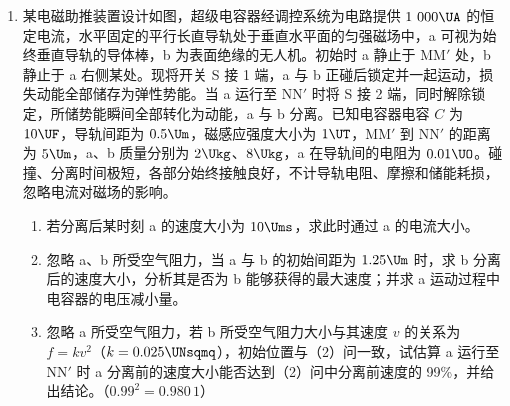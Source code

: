 \documentclass[\gkver]{gaokaozhenti}
\begin{document}
\begin{enumerate}
\onepicture[w=9.0cm, align=right]{}


\item
某电磁助推装置设计如图，超级电容器经调控系统为电路提供 $1\ 000\UA$ 的恒定电流，水平固定的平行长直导轨处于垂直水平面的匀强磁场中，a 可视为始终垂直导轨的导体棒，b 为表面绝缘的无人机。初始时 a 静止于 MM$'$ 处，b 静止于 a 右侧某处。现将开关 S 接 1 端，a 与 b 正碰后锁定并一起运动，损失动能全部储存为弹性势能。当 a 运行至 NN$'$ 时将 S 接 2 端，同时解除锁定，所储势能瞬间全部转化为动能，a 与 b 分离。已知电容器电容 $C$ 为 $10\UF$，导轨间距为 $0.5\Um$，磁感应强度大小为 $1\UT$，MM$'$ 到 NN$'$ 的距离为 $5\Um$，a、b 质量分别为 $2\Ukg$、$8\Ukg$，a 在导轨间的电阻为 $0.01\UO$。碰撞、分离时间极短，各部分始终接触良好，不计导轨电阻、摩擦和储能耗损，忽略电流对磁场的影响。
\begin{enumerate}
\item
若分离后某时刻 a 的速度大小为 $10\Ums$，求此时通过 a 的电流大小。
\item
忽略 a、b 所受空气阻力，当 a 与 b 的初始间距为 $1.25\Um$ 时，求 b 分离后的速度大小，分析其是否为 b 能够获得的最大速度；并求 a 运动过程中电容器的电压减小量。
\item
忽略 a 所受空气阻力，若 b 所受空气阻力大小与其速度 $v$ 的关系为 $f = kv^{2}$（$k = 0.025\UNsqmq$），初始位置与（2）问一致，试估算 a 运行至 NN$'$ 时 a 分离前的速度大小能否达到（2）问中分离前速度的 99\%，并给出结论。（$0.99^{2} = 0.980\,1$）
\end{enumerate}


\end{enumerate}
\end{document}
